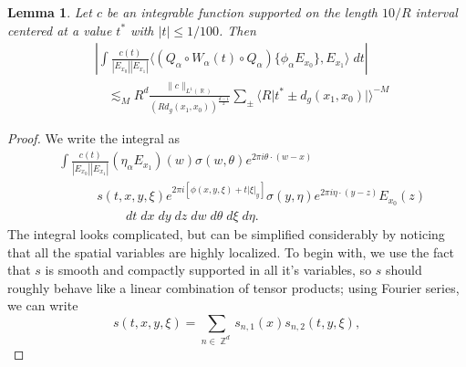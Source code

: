\documentclass[dvipsnames,letterpaper,12pt]{article}
\DeclareMathOperator{\RR}{\mathbb{R}}
\DeclareMathOperator{\ZZ}{\mathbb{Z}}
\newtheorem{lemma}[theorem]{Lemma}
\begin{document}
\begin{lemma}
    Let $c$ be an integrable function supported on the length $10/R$ interval centered at a value $t^*$ with $|t| \leq 1/100$. Then
    \begin{align*}
        & \left| \int \frac{c(t)}{|E_{x_0}| |E_{x_1}|} \big\langle (Q_\alpha \circ W_\alpha(t) \circ Q_\alpha) \{ \phi_\alpha E_{x_0} \}, E_{x_1} \big\rangle\; dt \right|\\
        &\quad \lesssim_M R^d \frac{\| c \|_{L^1(\RR)}}{( R d_g(x_1,x_0) )^{\frac{d-1}{2}}} \sum_{\pm} \Big\langle R \big| t^* \pm d_g(x_1,x_0) \big| \Big\rangle^{-M}
    \end{align*}
\end{lemma}
\begin{proof}
    We write the integral as
    \begin{align*}
        & \int \frac{c(t)}{|E_{x_0}| |E_{x_1}|} (\eta_\alpha E_{x_1})(w)  \sigma(w,\theta) e^{2 \pi i \theta \cdot (w - x)}\\
        &\quad\quad\quad s(t,x,y,\xi) e^{2 \pi i [ \phi(x,y,\xi) + t |\xi|_y ]} \sigma(y,\eta) e^{2 \pi i \eta \cdot (y - z)} E_{x_0}(z)\\
        &\quad\quad\quad\quad\quad \; dt\; dx\; dy\; dz\; dw\; d\theta\; d\xi\; d\eta.
    \end{align*}
    The integral looks complicated, but can be simplified considerably by noticing that all the spatial variables are highly localized. To begin with, we use the fact that $s$ is smooth and compactly supported in all it's variables, so $s$ should roughly behave like a linear combination of tensor products; using Fourier series, we can write
    \[ s(t,x,y,\xi) = \sum_{n \in \ZZ^d} s_{n,1}(x) s_{n,2}(t,y,\xi), \]

\end{proof}
\end{document}

